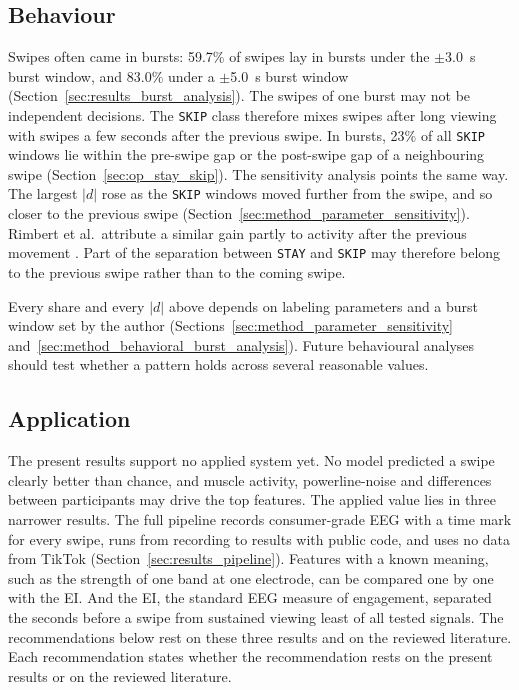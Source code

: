 \documentclass[12pt,a4paper]{report}
\begin{document}
\subsection{Behaviour}

Swipes often came in bursts: 59.7\% of swipes lay in bursts under the \(\pm\)3.0~s burst window, and 83.0\% under a \(\pm\)5.0~s burst window (Section~\ref{sec:results_burst_analysis}). The swipes of one burst may not be independent decisions. The \texttt{SKIP} class therefore mixes swipes after long viewing with swipes a few seconds after the previous swipe. In bursts, 23\% of all \texttt{SKIP} windows lie within the pre-swipe gap or the post-swipe gap of a neighbouring swipe (Section~\ref{sec:op_stay_skip}). The sensitivity analysis points the same way. The largest \(|d|\) rose as the \texttt{SKIP} windows moved further from the swipe, and so closer to the previous swipe (Section~\ref{sec:method_parameter_sensitivity}). Rimbert et al.\ attribute a similar gain partly to activity after the previous movement \cite{rimbert_impact_2023}. Part of the separation between \texttt{STAY} and \texttt{SKIP} may therefore belong to the previous swipe rather than to the coming swipe.

Every share and every \(|d|\) above depends on labeling parameters and a burst window set by the author (Sections~\ref{sec:method_parameter_sensitivity} and~\ref{sec:method_behavioral_burst_analysis}). Future behavioural analyses should test whether a pattern holds across several reasonable values.

\subsection{Application}

The present results support no applied system yet. No model predicted a swipe clearly better than chance, and muscle activity, powerline-noise and differences between participants may drive the top features. The applied value lies in three narrower results. The full pipeline records consumer-grade EEG with a time mark for every swipe, runs from recording to results with public code, and uses no data from TikTok (Section~\ref{sec:results_pipeline}). Features with a known meaning, such as the strength of one band at one electrode, can be compared one by one with the EI. And the EI, the standard EEG measure of engagement, separated the seconds before a swipe from sustained viewing least of all tested signals. The recommendations below rest on these three results and on the reviewed literature. Each recommendation states whether the recommendation rests on the present results or on the reviewed literature.
\end{document}
